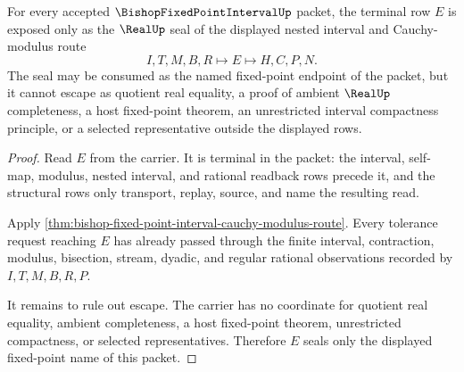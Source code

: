 \begin{theorem}
\label{thm:bishop-fixed-point-interval-real-seal-nonescape}
For every accepted $\BishopFixedPointIntervalUp$ packet, the terminal row $E$ is exposed only as the $\RealUp$ seal of the displayed nested interval and Cauchy-modulus route
$$
I,T,M,B,R \longmapsto E \longmapsto H,C,P,N.
$$
The seal may be consumed as the named fixed-point endpoint of the packet, but it cannot escape as quotient real equality, a proof of ambient $\RealUp$ completeness, a host fixed-point theorem, an unrestricted interval compactness principle, or a selected representative outside the displayed rows.
\end{theorem}
\begin{proof}
Read $E$ from the carrier. It is terminal in the packet: the interval, self-map, modulus, nested interval, and rational readback rows precede it, and the structural rows only transport, replay, source, and name the resulting read.

Apply \autoref{thm:bishop-fixed-point-interval-cauchy-modulus-route}. Every tolerance request reaching $E$ has already passed through the finite interval, contraction, modulus, bisection, stream, dyadic, and regular rational observations recorded by $I,T,M,B,R,P$.

It remains to rule out escape. The carrier has no coordinate for quotient real equality, ambient completeness, a host fixed-point theorem, unrestricted compactness, or selected representatives. Therefore $E$ seals only the displayed fixed-point name of this packet.
\end{proof}




